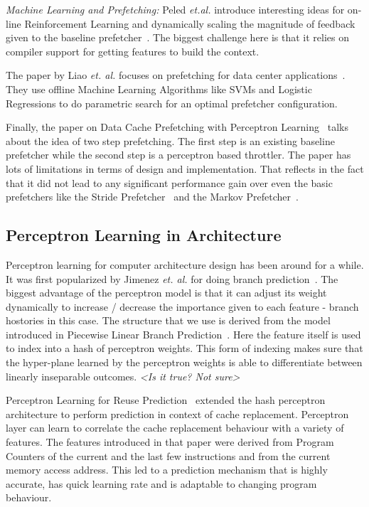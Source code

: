 \textit{Machine Learning and Prefetching:} Peled \textit{et.al.}
introduce interesting ideas for on-line Reinforcement Learning and
dynamically scaling the magnitude of feedback given to the baseline
prefetcher~\cite{Semantics}. The biggest challenge here is that it
relies on compiler support for getting features to build the context.

The paper by Liao \textit{et. al.} focuses on prefetching for data
center applications~\cite{Datacenter}. They use offline Machine
Learning Algorithms like SVMs and Logistic Regressions to do
parametric search for an optimal prefetcher configuration.

Finally, the paper on Data Cache Prefetching with Perceptron
Learning~\cite{BadPerc} talks about the idea of two step prefetching.
The first step is an existing baseline prefetcher while the second
step is a perceptron based throttler.  The paper has lots of
limitations in terms of design and implementation.  That reflects in
the fact that it did not lead to any significant performance gain over
even the basic prefetchers like the Stride Prefetcher~\cite{Stride} and
the Markov Prefetcher~\cite{Markov}.


\subsection{Perceptron Learning in Architecture}
\label{Background-Perceptron}
Perceptron learning for computer architecture design has been around
for a while.  It was first popularized by Jimenez \textit{et. al.} for
doing branch prediction~\cite{Perc_Branch}. The biggest advantage of 
the perceptron model is that it can adjust its weight dynamically 
to increase / decrease the importance given to each feature - branch 
hostories in this case.
The structure that we use is derived from the model introduced in
Piecewise Linear Branch Prediction~\cite{Piece_Linear}.  Here the
feature itself is used to index into a hash of perceptron weights.
This form of indexing makes sure that the hyper-plane learned by the
perceptron weights is able to differentiate between linearly
inseparable outcomes.  \textit{<Is it true? Not sure>}


Perceptron Learning for Reuse Prediction~\cite{Perc_Reuse} extended the
hash perceptron architecture to perform prediction in context of cache
replacement.  Perceptron layer can learn to correlate the cache
replacement behaviour with a variety of features. The features
introduced in that paper were derived from Program Counters of the
current and the last few instructions and from the current memory 
access address.  This led to a
prediction mechanism that is highly accurate, has quick learning rate
and is adaptable to changing program behaviour.  


